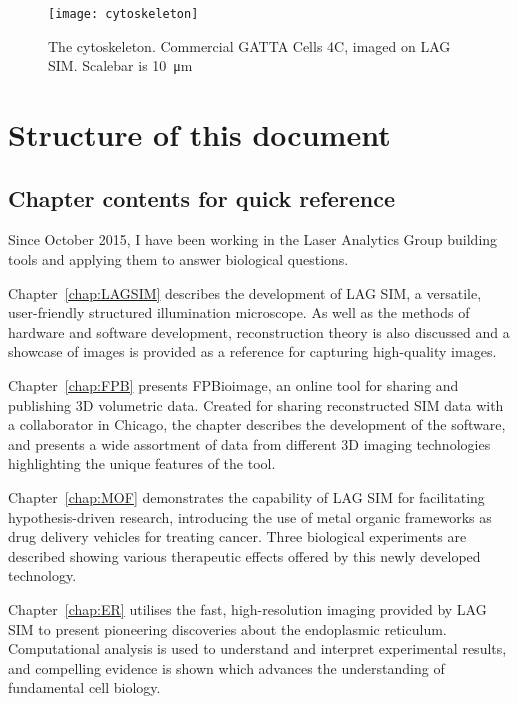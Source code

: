 \begin{figure}[htbp!]
\centering
\texttt{[image: cytoskeleton]}
\caption[Introduction: The cytoskeleton]{The cytoskeleton. Commercial GATTA Cells 4C, imaged on LAG SIM. Scalebar is \SI{10}{\micro\metre} } %
\label{fig:cytoskeleton}
\end{figure}


\section{Structure of this document}

\subsection{Chapter contents for quick reference}
Since October 2015, I have been working in the Laser Analytics Group building tools and applying them to answer biological questions. 

Chapter~\ref{chap:LAGSIM} describes the development of LAG SIM, a versatile, user-friendly structured illumination microscope. 
As well as the methods of hardware and software development, reconstruction theory is also discussed and a showcase of images is provided as a reference for capturing high-quality images. 

Chapter~\ref{chap:FPB} presents FPBioimage, an online tool for sharing and publishing 3D volumetric data. 
Created for sharing reconstructed SIM data with a collaborator in Chicago, the chapter describes the development of the software, and presents a wide assortment of data from different 3D imaging technologies highlighting the unique features of the tool. 

Chapter~\ref{chap:MOF} demonstrates the capability of LAG SIM for facilitating hypothesis-driven research, introducing the use of metal organic frameworks as drug delivery vehicles for treating cancer. 
Three biological experiments are described showing various therapeutic effects offered by this newly developed technology. 

Chapter~\ref{chap:ER} utilises the fast, high-resolution imaging provided by LAG SIM to present pioneering discoveries about the endoplasmic reticulum. 
Computational analysis is used to understand and interpret experimental results, and compelling evidence is shown which advances the understanding of fundamental cell biology. 

